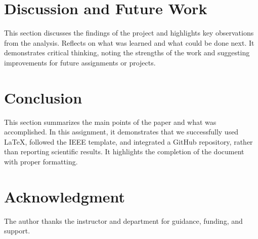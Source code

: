 \documentclass[conference]{IEEEtran}
\begin{document}
\section{Discussion and Future Work}
This section discusses the findings of the project and highlights key observations from the analysis. Reflects on what was learned and what could be done next. It demonstrates critical thinking, noting the strengths of the work and suggesting improvements for future assignments or projects.

\section{Conclusion}
This section summarizes the main points of the paper and what was accomplished. In this assignment, it demonstrates that we successfully used LaTeX, followed the IEEE template, and integrated a GitHub repository, rather than reporting scientific results. It highlights the completion of the document with proper formatting.


\section*{Acknowledgment}
The author thanks the instructor and department for guidance, funding, and support.





\end{document}
